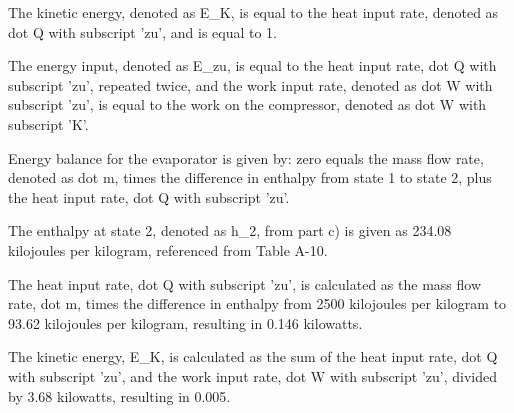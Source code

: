 The kinetic energy, denoted as E_K, is equal to the heat input rate, denoted as dot Q with subscript 'zu', and is equal to 1.

The energy input, denoted as E_zu, is equal to the heat input rate, dot Q with subscript 'zu', repeated twice, and the work input rate, denoted as dot W with subscript 'zu', is equal to the work on the compressor, denoted as dot W with subscript 'K'.

Energy balance for the evaporator is given by: zero equals the mass flow rate, denoted as dot m, times the difference in enthalpy from state 1 to state 2, plus the heat input rate, dot Q with subscript 'zu'.

The enthalpy at state 2, denoted as h_2, from part c) is given as 234.08 kilojoules per kilogram, referenced from Table A-10.

The heat input rate, dot Q with subscript 'zu', is calculated as the mass flow rate, dot m, times the difference in enthalpy from 2500 kilojoules per kilogram to 93.62 kilojoules per kilogram, resulting in 0.146 kilowatts.

The kinetic energy, E_K, is calculated as the sum of the heat input rate, dot Q with subscript 'zu', and the work input rate, dot W with subscript 'zu', divided by 3.68 kilowatts, resulting in 0.005.